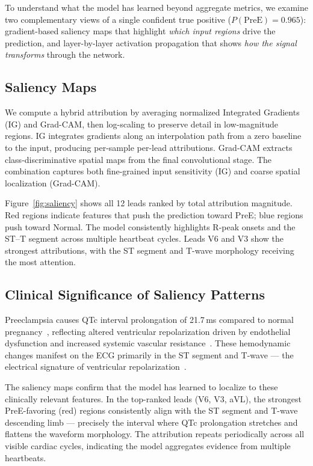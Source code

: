 \documentclass[sigconf,nonacm]{acmart}
\begin{document}
To understand what the model has learned beyond aggregate metrics, we examine two complementary views of a single confident true positive ($P(\text{PreE}){=}0.965$): gradient-based saliency maps that highlight \textit{which input regions} drive the prediction, and layer-by-layer activation propagation that shows \textit{how the signal transforms} through the network.

\subsection{Saliency Maps}

We compute a hybrid attribution by averaging normalized Integrated Gradients (IG) and Grad-CAM, then log-scaling to preserve detail in low-magnitude regions. IG integrates gradients along an interpolation path from a zero baseline to the input, producing per-sample per-lead attributions. Grad-CAM extracts class-discriminative spatial maps from the final convolutional stage. The combination captures both fine-grained input sensitivity (IG) and coarse spatial localization (Grad-CAM).

Figure~\ref{fig:saliency} shows all 12 leads ranked by total attribution magnitude. Red regions indicate features that push the prediction toward PreE; blue regions push toward Normal. The model consistently highlights R-peak onsets and the ST--T segment across multiple heartbeat cycles. Leads V6 and V3 show the strongest attributions, with the ST segment and T-wave morphology receiving the most attention.

\subsection{Clinical Significance of Saliency Patterns}

Preeclampsia causes QTc interval prolongation of 21.7\,ms compared to normal pregnancy~\cite{aboshady_qtc_2025}, reflecting altered ventricular repolarization driven by endothelial dysfunction and increased systemic vascular resistance~\cite{raffaelli_pre-eclampsia_2014}. These hemodynamic changes manifest on the ECG primarily in the ST segment and T-wave --- the electrical signature of ventricular repolarization~\cite{angeli_electrocardiographic_2014}.

The saliency maps confirm that the model has learned to localize to these clinically relevant features. In the top-ranked leads (V6, V3, aVL), the strongest PreE-favoring (red) regions consistently align with the ST segment and T-wave descending limb --- precisely the interval where QTc prolongation stretches and flattens the waveform morphology. The attribution repeats periodically across all visible cardiac cycles, indicating the model aggregates evidence from multiple heartbeats.
\end{document}
